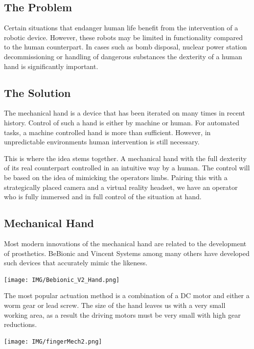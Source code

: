 \documentclass{article}
\begin{document}
\subsection{The Problem}
Certain situations that endanger human life benefit from the intervention of a robotic device. However, these robots may be limited in functionality compared to the human counterpart. In cases such as bomb disposal, nuclear power station decommissioning or handling of dangerous substances the dexterity of a human hand is significantly important.

\subsection{The Solution}
The mechanical hand is a device that has been iterated on many times in recent history. Control of such a hand is either by machine or human. For automated tasks, a machine controlled hand is more than sufficient. However, in unpredictable environments human intervention is still necessary.

This is where the idea stems together. A mechanical hand with the full dexterity of its real counterpart controlled in an intuitive way by a human. The control will be based on the idea of mimicking the operators limbs. Pairing this with a strategically placed camera and a virtual reality headset, we have an operator who is fully immersed and in full control of the situation at hand.

\subsection{Mechanical Hand}
Most modern innovations of the mechanical hand are related to the development of prosthetics. BeBionic \cite{bebionic} and Vincent Systems \cite{vincent} among many others have developed such devices that accurately mimic the likeness.

\begin{center}
\texttt{[image: IMG/Bebionic\_V2\_Hand.png]}
\end{center}

The most popular actuation method is a combination of a DC motor and either a worm gear or lead screw. The size of the hand leaves us with a very small working area, as a result the driving motors must be very small with high gear reductions.

\begin{center}
\texttt{[image: IMG/fingerMech2.png]}
\end{center}
\end{document}
